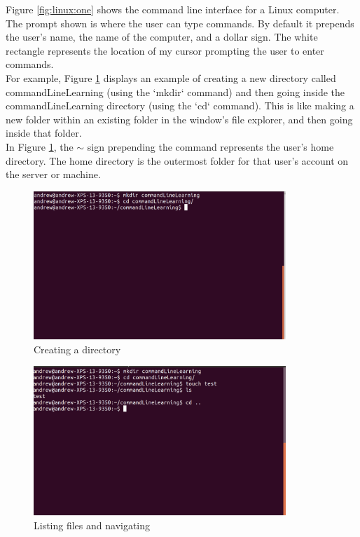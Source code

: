 Figure \ref{fig:linux:one} shows the command line interface for a Linux computer. The prompt shown is where the user can type commands. By default it prepends the user’s name, the name of the computer, and a dollar sign. The white rectangle represents the location of my cursor prompting the user to enter commands. \\

For example, Figure \ref{fig:linux:two} displays an example of creating a new directory called commandLineLearning (using the `mkdir` command) and then going inside the commandLineLearning directory (using the `cd` command). This is like making a new folder within an existing folder in the window’s file explorer, and then going inside that folder. \\

In Figure \ref{fig:linux:two}, the $\sim$ sign prepending the command represents the user’s home directory. The home directory is the outermost folder for that user’s account on the server or machine. \\

\begin{figure}
	\centering
	\includegraphics[width=0.85\textwidth]{images/commandLineTwo.png}
	\caption{Creating a directory}
	\label{fig:linux:two}
\end{figure}

\begin{figure}
	\centering
	\includegraphics[width=0.85\textwidth]{images/commandLineThree.png}
	\caption{Listing files and navigating}
	\label{fig:linux:three}
\end{figure}


